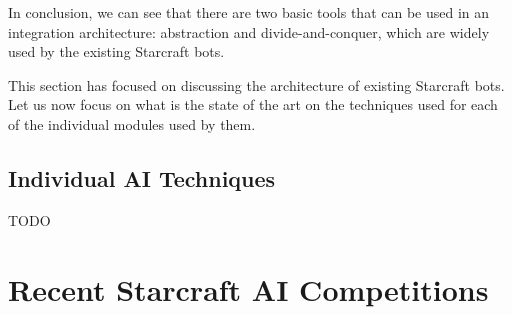 \documentclass[journal]{IEEEtran}
\begin{document}
In conclusion, we can see that there are two basic tools that can be used in an integration architecture: abstraction and divide-and-conquer, which are widely used by the existing Starcraft bots. 

This section has focused on discussing the architecture of existing Starcraft bots. Let us now focus on what is the state of the art on the techniques used for each of the individual modules used by them.

\subsection{Individual AI Techniques}\label{sec:techniques}

{\color{red} TODO}

\section{Recent Starcraft AI Competitions}\label{sec:competition}
\end{document}
